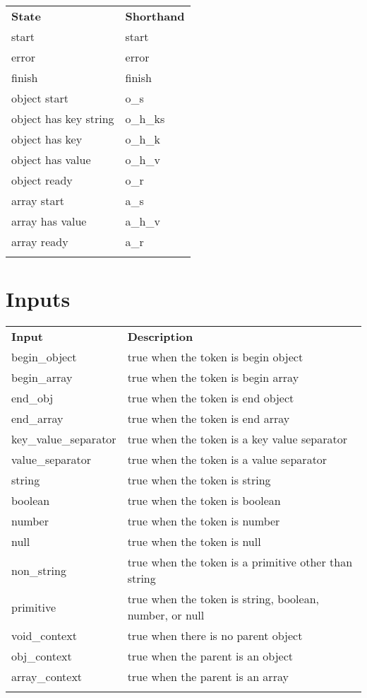 \documentclass[11pt, letterpaper]{article}
\newcommand{\thickhline}{\specialrule{1pt}{0pt}{0pt}}
\newcommand{\objectstart}{o\_s}
\newcommand{\objectready}{o\_r}
\newcommand{\objecthaskeystring}{o\_h\_ks}
\newcommand{\objecthaskey}{o\_h\_k}
\newcommand{\objecthasvalue}{o\_h\_v}
\newcommand{\arrayhasvalue}{a\_h\_v}
\newcommand{\arraystart}{a\_s}
\begin{document}
    \begin{tabu} to \linewidth{ X[l] | X[l] }
      \thickhline
      \textbf{State} & \textbf{Shorthand} \\ \thickhline
      start & start \\ \hline
      error & error \\ \hline
      finish & finish \\ \hline
      object start & \objectstart \\ \hline
      object has key string & \objecthaskeystring \\ \hline
      object has key & \objecthaskey \\ \hline
      object has value & \objecthasvalue \\ \hline
      object ready & \objectready \\ \hline
      array start & \arraystart \\ \hline
      array has value & \arrayhasvalue \\ \hline
      array ready & a\_r \\ \thickhline
    \end{tabu}
  
  \section{Inputs}
  
    \begin{tabu} to \linewidth{ X[1,l] | X[3,l] }
      \thickhline
      \textbf{Input} & \textbf{Description} \\ \thickhline 
      begin\_object & true when the token is begin object \\ \hline
      begin\_array & true when the token is begin array \\ \hline
      end\_obj & true when the token is end object \\ \hline
      end\_array & true when the token is end array \\ \hline
      key\_value\_separator & true when the token is a key value separator \\ \hline
      value\_separator & true when the token is a value separator \\ \hline
      string & true when the token is string \\ \hline
      boolean & true when the token is boolean \\ \hline
      number & true when the token is number \\ \hline
      null & true when the token is null \\ \hline
      non\_string & true when the token is a primitive other than string \\ \hline
      primitive & true when the token is string, boolean, number, or null \\ \hline
      void\_context & true when there is no parent object \\ \hline
      obj\_context & true when the parent is an object \\ \hline
      array\_context & true when the parent is an array \\ \thickhline
    \end{tabu}
    
\end{document}
